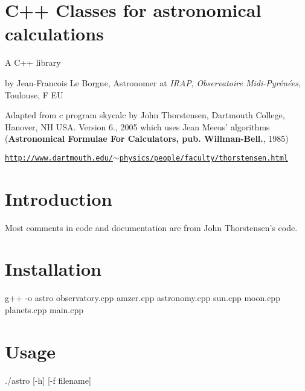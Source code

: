 \par
 \section*{C++ Classes for astronomical calculations}

\par
 A C++ library\par
 by Jean-\/\-Francois Le Borgne, Astronomer at {\itshape I\-R\-A\-P}, {\itshape Observatoire Midi-\/\-Pyrénées}, Toulouse, F E\-U\par
 Adapted from c program skycalc by John Thorstensen, Dartmouth College, Hanover, N\-H U\-S\-A. Version 6., 2005 which uses Jean Meeus' algorithms ({\bfseries Astronomical Formulae For Calculators, pub. Willman-\/\-Bell.}, 1985)\par
 \href{http://www.dartmouth.edu/~physics/people/faculty/thorstensen.html}{\tt http\-://www.\-dartmouth.\-edu/$\sim$physics/people/faculty/thorstensen.\-html}\par
\hypertarget{index_intro_sec}{}\section{Introduction}\label{index_intro_sec}
Most comments in code and documentation are from John Thorstensen's code.\hypertarget{index_install_sec}{}\section{Installation}\label{index_install_sec}
g++ -\/o astro observatory.\-cpp amzer.\-cpp astronomy.\-cpp sun.\-cpp moon.\-cpp planets.\-cpp main.\-cpp\hypertarget{index_Usage}{}\section{Usage}\label{index_Usage}
./astro \mbox{[}-\/h\mbox{]} \mbox{[}-\/f filename\mbox{]}\par

